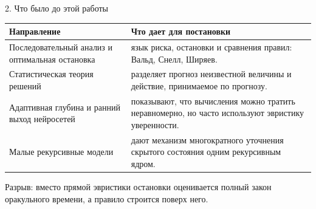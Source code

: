 \documentclass[aspectratio=169,11pt]{beamer}
\newcommand{\smallnote}[1]{{\color{mutedText}\small #1}}
\begin{document}
\begin{frame}{2. Что было до этой работы}
\small
\small\begin{tabularx}{\textwidth}{@{}p{}Y@{}}
\toprule
\textbf{Направление} & \textbf{Что дает для постановки} \\
\midrule
Последовательный анализ и оптимальная остановка & язык риска, остановки и сравнения правил: Вальд,
Снелл, Ширяев.\\[1mm]
Статистическая теория решений & разделяет прогноз неизвестной величины и действие, принимаемое по
прогнозу.\\[1mm]
Адаптивная глубина и ранний выход нейросетей & показывают, что вычисления можно тратить
неравномерно, но часто используют эвристику уверенности.\\[1mm]
Малые рекурсивные модели & дают механизм многократного уточнения скрытого состояния одним
рекурсивным ядром.\\
\bottomrule
\end{tabularx}

\vspace{4mm}
\vspace{2mm}
\smallnote{Разрыв: вместо прямой эвристики остановки оценивается полный закон оракульного времени,
а правило строится поверх него.}
\end{frame}
\end{document}
